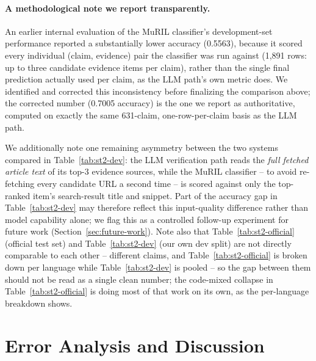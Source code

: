 \documentclass[
]{ceurart}
\begin{document}
\paragraph{A methodological note we report transparently.}
An earlier internal evaluation of the MuRIL classifier's
development-set performance reported a substantially lower accuracy
(0.5563), because it scored every individual (claim, evidence) pair the
classifier was run against (1{,}891 rows: up to three candidate
evidence items per claim), rather than the single final prediction
actually used per claim, as the LLM path's own metric does. We
identified and corrected this inconsistency before finalizing the
comparison above; the corrected number (0.7005 accuracy) is the one we
report as authoritative, computed on exactly the same 631-claim,
one-row-per-claim basis as the LLM path.

We additionally note one remaining asymmetry between the two systems
compared in Table~\ref{tab:st2-dev}: the LLM verification path reads
the \emph{full fetched article text} of its top-3 evidence sources,
while the MuRIL classifier -- to avoid re-fetching every candidate URL
a second time -- is scored against only the top-ranked item's
search-result title and snippet. Part of the accuracy gap in
Table~\ref{tab:st2-dev} may therefore reflect this input-quality
difference rather than model capability alone; we flag this as a
controlled follow-up experiment for future work
(Section~\ref{sec:future-work}). Note also that
Table~\ref{tab:st2-official} (official test set) and
Table~\ref{tab:st2-dev} (our own dev split) are not directly comparable
to each other -- different claims, and Table~\ref{tab:st2-official} is
broken down per language while Table~\ref{tab:st2-dev} is pooled -- so
the gap between them should not be read as a single clean number; the
code-mixed collapse in Table~\ref{tab:st2-official} is doing most of
that work on its own, as the per-language breakdown shows.

\section{Error Analysis and Discussion}
\label{sec:discussion}
\end{document}
